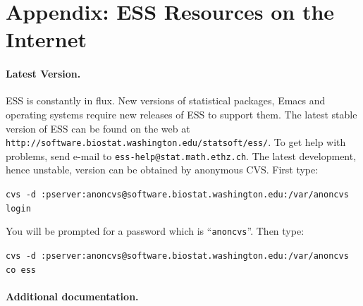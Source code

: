\documentclass{article}
\def\url#1{\stexttt{#1}} %
\newcommand*{\SAS}{\textsc{SAS}}
\newcommand{\stexttt}[1]{{\small\texttt{#1}}}
\newenvironment{Comment}{\begin{quote}\small\itshape }{\end{quote}}
\begin{document}







\clearpage

\appendix 
\section{Appendix: ESS Resources on the Internet}
\label{sec:access}

\paragraph{Latest Version.}

ESS is constantly in flux.  New versions of statistical
packages, Emacs and operating systems require new releases of ESS to
support them.  The latest stable version of ESS can be found on the web at
\url{http://software.biostat.washington.edu/statsoft/ess/}.  To get help
with problems, send e-mail to \url{ess-help@stat.math.ethz.ch}.
The latest development, hence unstable, version can be obtained by
anonymous CVS.  First type:

\stexttt{cvs -d
  :pserver:anoncvs@software.biostat.washington.edu:/var/anoncvs login}
  
You will be prompted for a password which is ``\stexttt{anoncvs}''.
Then type:

\stexttt{cvs -d
  :pserver:anoncvs@software.biostat.washington.edu:/var/anoncvs co
  ess}

\paragraph{Additional documentation.} 
\end{document}
